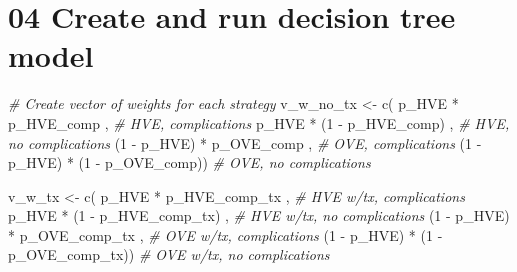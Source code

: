 \documentclass[
]{article}
\newenvironment{Shaded}{\begin{snugshade}}{\end{snugshade}}
\newcommand{\CommentTok}[1]{\textcolor[rgb]{0.56,0.35,0.01}{\textit{#1}}}
\newcommand{\DecValTok}[1]{\textcolor[rgb]{0.00,0.00,0.81}{#1}}
\newcommand{\FunctionTok}[1]{\textcolor[rgb]{0.00,0.00,0.00}{#1}}
\newcommand{\NormalTok}[1]{#1}
\newcommand{\OtherTok}[1]{\textcolor[rgb]{0.56,0.35,0.01}{#1}}
\newcommand{\SpecialCharTok}[1]{\textcolor[rgb]{0.00,0.00,0.00}{#1}}
\begin{document}
\hypertarget{create-and-run-decision-tree-model}{%
\section{04 Create and run decision tree
model}\label{create-and-run-decision-tree-model}}

\begin{Shaded}
\begin{Highlighting}[]
\CommentTok{\# Create vector of weights for each strategy}
\NormalTok{v\_w\_no\_tx  }\OtherTok{\textless{}{-}} \FunctionTok{c}\NormalTok{(    p\_HVE  }\SpecialCharTok{*}\NormalTok{      p\_HVE\_comp     ,  }\CommentTok{\# HVE, complications}
\NormalTok{                    p\_HVE  }\SpecialCharTok{*}\NormalTok{ (}\DecValTok{1} \SpecialCharTok{{-}}\NormalTok{ p\_HVE\_comp)    ,  }\CommentTok{\# HVE, no complications}
\NormalTok{               (}\DecValTok{1} \SpecialCharTok{{-}}\NormalTok{ p\_HVE) }\SpecialCharTok{*}\NormalTok{      p\_OVE\_comp     ,  }\CommentTok{\# OVE, complications}
\NormalTok{               (}\DecValTok{1} \SpecialCharTok{{-}}\NormalTok{ p\_HVE) }\SpecialCharTok{*}\NormalTok{ (}\DecValTok{1} \SpecialCharTok{{-}}\NormalTok{ p\_OVE\_comp))      }\CommentTok{\# OVE, no complications}
  
\NormalTok{v\_w\_tx     }\OtherTok{\textless{}{-}} \FunctionTok{c}\NormalTok{(    p\_HVE  }\SpecialCharTok{*}\NormalTok{      p\_HVE\_comp\_tx  ,  }\CommentTok{\# HVE w/tx, complications}
\NormalTok{                    p\_HVE  }\SpecialCharTok{*}\NormalTok{ (}\DecValTok{1} \SpecialCharTok{{-}}\NormalTok{ p\_HVE\_comp\_tx) ,  }\CommentTok{\# HVE w/tx, no complications}
\NormalTok{               (}\DecValTok{1} \SpecialCharTok{{-}}\NormalTok{ p\_HVE) }\SpecialCharTok{*}\NormalTok{      p\_OVE\_comp\_tx  ,  }\CommentTok{\# OVE w/tx, complications}
\NormalTok{               (}\DecValTok{1} \SpecialCharTok{{-}}\NormalTok{ p\_HVE) }\SpecialCharTok{*}\NormalTok{ (}\DecValTok{1} \SpecialCharTok{{-}}\NormalTok{ p\_OVE\_comp\_tx))   }\CommentTok{\# OVE w/tx, no complications}
  

\end{Highlighting}
\end{Shaded}
\end{document}
